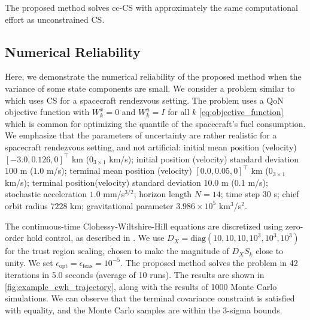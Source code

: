 \begin{remark}
	The proposed method solves cc-CS with approximately the same computational effort as unconstrained CS.
\end{remark}

\subsection{Numerical Reliability}
Here, we demonstrate the numerical reliability of the proposed method when the variance of some state components are small. We consider a problem similar to \cite{oguriChanceConstrainedControlSafe2024a} which uses CS for a spacecraft rendezvous setting. The problem uses a QoN objective function with $W_k^x = 0$ and $W_k^u = I$ for all $k$ \cref{eq:objective_function} which is common for optimizing the quantile of the spacecraft's fuel consumption. We emphasize that the parameters of uncertainty are rather realistic for a spacecraft rendezvous setting, and not artificial: initial mean position (velocity) $[-3.0, 0.126, 0]^\top$ km ($0_{3 \times 1}$ km/s); initial position (velocity) standard deviation $100$ m ($1.0$ m/s); terminal mean position (velocity) $[0.0, 0.05, 0]^\top$ km ($0_{3 \times 1}$ km/s); terminal position(velocity) standard deviation $10.0$ m ($0.1$ m/s); stochastic acceleration $1.0$ mm/s$^{3/2}$; horizon length $N = 14$; time step $30$ s; chief orbit radius $7228$ km; gravitational parameter $3.986 \times 10^{5}$ km$^3$/s$^2$.

The continuous-time Clohessy-Wiltshire-Hill equations \cite{schaubAnalyticalMechanicsSpace2003} are discretized using zero-order hold control, as described in \cite{oguriChanceConstrainedControlSafe2024a}. 
We use $D_X = \mathrm{diag}(10, 10, 10, 10^3, 10^3, 10^3)$ for the trust region scaling, chosen to make the magnitude of $D_X S_k$ close to unity. We set \( \epsilon_{\mathrm{opt}} = \epsilon_{\mathrm{feas}} = 10^{-5}\).
The proposed method solves the problem in 42 iterations in 5.0 seconds (average of 10 runs). The results are shown in \cref{fig:example_cwh_trajectory}, along with the results of 1000 Monte Carlo simulations. We can observe that the terminal covariance constraint is satisfied with equality, and the Monte Carlo samples are within the 3-sigma bounds.

